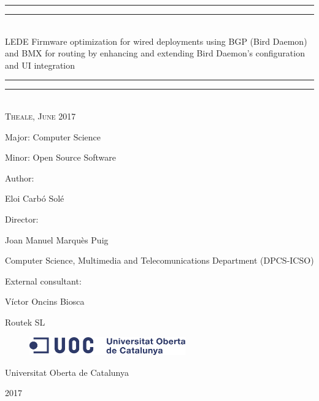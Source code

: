 \begin{titlepage}
    \centering
    \vspace*{\baselineskip}
    \rule{\textwidth}{1.6pt}\vspace*{-\baselineskip}\vspace*{2pt}
    \rule{\textwidth}{0.4pt}\\[\baselineskip]
    {\LARGE LEDE Firmware optimization for wired deployments using BGP (Bird Daemon) and BMX for routing by enhancing and extending Bird Daemon's configuration and UI integration}
    \rule{\textwidth}{0.4pt}\vspace*{-\baselineskip}\vspace{3.2pt}
    \rule{\textwidth}{1.6pt}\\[\baselineskip]
    \scshape
    Theale, June 2017\par
    \vspace*{2\baselineskip}
    Major: Computer Science\par
    Minor: Open Source Software\par
    \vspace*{2\baselineskip}
    Author: \\
    {\Large Eloi Carb\'{o} Sol\'{e}\par}
    \vspace*{1\baselineskip}
    Director: \\ 
    {\large Joan Manuel Marqu\`{e}s Puig\par}
    Computer Science, Multimedia and Telecomunications Department (DPCS-ICSO)\par
    \vspace*{1\baselineskip}
    External consultant: \\
    {\large V\'{i}ctor Oncins Biosca\par}
    Routek SL
    \vfill
    \begin{figure}[ht!]
        \centering
        \includegraphics[width=0.6\textwidth]{images/logo}
	\end{figure}
    {\large Universitat Oberta de Catalunya}\par
    {\scshape 2017}
\end{titlepage}

\newpage
%

\newpage
%

\cleardoublepage

\pagestyle{plain}


\def\contentsname{Index}
\tableofcontents
\newpage

\listoffigures
\newpage
\lstlistoflistings
\newpage

\newpage

